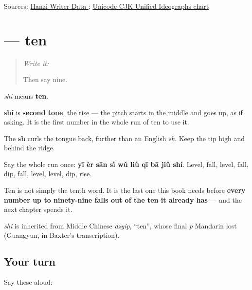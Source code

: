 \begin{tcolorbox}[breakable,colback=teal!4,colframe=teal!35!black,title={Before you move on}]
Sources: \href{https://raw.githubusercontent.com/chanind/hanzi-writer-data/68d10a4b21150cae5e1ebbd223eed289cf32d90c/data/\%E5\%8D\%81.json}{Hanzi Writer Data }; \href{https://www.unicode.org/charts/PDF/U4E00.pdf}{Unicode CJK Unified Ideographs chart}
\end{tcolorbox}
\section[\texorpdfstring{\zh{十} (shí)}{十 (shí)}]{ — ten}

\label{lesson:ZH-C20-shi}



\begin{quote}
\emph{Write it:} 

Then say nine.
\end{quote}

\begin{sounds}
\textbf{} \emph{shí} means \textbf{ten}.

\textbf{shí} is \textbf{second tone}, the rise — the pitch starts in the middle and goes up, as if asking. It is the first number in the whole run of ten to use it.

The \textbf{sh} curls the tongue back, further than an English \emph{sh}. Keep the tip high and behind the ridge.

Say the whole run once: \textbf{yī èr sān sì wǔ liù qī bā jiǔ shí}. Level, fall, level, fall, dip, fall, level, level, dip, rise.
\end{sounds}

\begin{grammarlens}[title={What you've built — the last of the ten}]
Ten is not simply the tenth word. It is the last one this book needs before \textbf{every number up to ninety-nine falls out of the ten it already has} — and the next chapter spends it.
\end{grammarlens}

\begin{cousinweb}
\textbf{} \emph{shí} is inherited from Middle Chinese \emph{dzyip}, \textquotedblleft{}ten\textquotedblright{}, whose final \emph{p} Mandarin lost (Guangyun, in Baxter's transcription).
\end{cousinweb}

\subsection*{Your turn}
Say these aloud:

